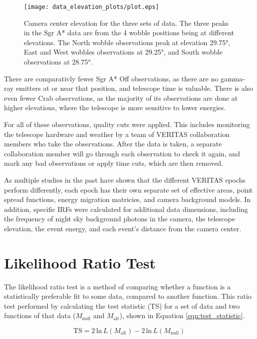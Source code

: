   \begin{figure}[ht]
    \centering
    \texttt{[image: data\_elevation\_plots/plot.eps]}
    \caption[VERITAS Data Elevation Exposure]{
      Camera center elevation for the three sets of data.
      The three peaks in the Sgr A* data are from the 4 wobble positions being at different elevations.
      The North wobble observations peak at elevation \nicetilde\ang{29.75}, East and West wobbles observations at \nicetilde\ang{29.25}, and South wobble observations at \nicetilde\ang{28.75}.
    }
    \label{fig:datapointingelevations}
  \end{figure}

  There are comparativly fewer Sgr A* Off observations, as there are no gamma-ray emitters at or near that position, and telescope time is valuable.
  There is also even fewer Crab observations, as the majority of its observations are done at higher elevations, where the telescope is more sensitive to lower energies.
  
  For all of these observations, quality cuts were applied.
  This includes monitoring the telescope hardware and weather by a team of VERITAS collaboration members who take the observations.
  After the data is taken, a separate collaboration member will go through each observation to check it again, and mark any bad observations or apply time cuts, which are then removed.

  As multiple studies in the past have shown that the different VERITAS epochs perform differently, each epoch has their own separate set of effective areas, point spread functions, energy migration matricies, and camera background models.
  In addition, specific IRFs were calculated for additional data dimensions, including the frequency of night sky background photons in the camera, the telescope elevation, the event energy, and each event's distance from the camera center.

\section{Likelihood Ratio Test}
  The likelihood ratio test is a method of comparing whether a function is a statistically preferable fit to some data, compared to another function.
  This ratio test performed by calculating the test statistic (TS) for a set of data and two functions of that data ($M_{\text{null}}$ and $M_{\text{alt}}$), shown in Equation \ref{eqn:test_statistic}.
  
  \begin{equation}\label{eqn:test_statistic}
    \text{TS} = 2 \, \text{ln} \, L \left(M_{\text{alt}} \right ) - 2 \, \text{ln} \, L \left( M_{\text{null}} \right )
  \end{equation}
  
